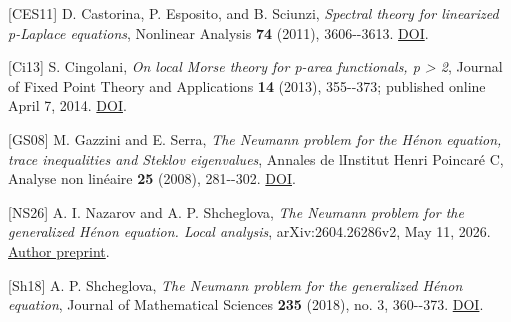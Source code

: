 \documentclass[11pt]{article}
\begin{document}
{[}CES11{]} D. Castorina, P. Esposito, and B. Sciunzi, \emph{Spectral
theory for linearized p-Laplace equations}, Nonlinear Analysis
\textbf{74} (2011), 3606-\/-3613.
\href{https://doi.org/10.1016/j.na.2011.03.009}{DOI}.

{[}Ci13{]} S. Cingolani, \emph{On local Morse theory for p-area
functionals, p \textgreater{} 2}, Journal of Fixed Point Theory and
Applications \textbf{14} (2013), 355-\/-373; published online April 7,
2014. \href{https://doi.org/10.1007/s11784-014-0163-6}{DOI}.

{[}GS08{]} M. Gazzini and E. Serra, \emph{The Neumann problem for the
Hénon equation, trace inequalities and Steklov eigenvalues}, Annales de
l\textquotesingle Institut Henri Poincaré C, Analyse non linéaire
\textbf{25} (2008), 281-\/-302.
\href{https://doi.org/10.1016/j.anihpc.2006.09.003}{DOI}.

{[}NS26{]} A. I. Nazarov and A. P. Shcheglova, \emph{The Neumann problem
for the generalized Hénon equation. Local analysis}, arXiv:2604.26286v2,
May 11, 2026. \href{https://arxiv.org/abs/2604.26286}{Author preprint}.

{[}Sh18{]} A. P. Shcheglova, \emph{The Neumann problem for the
generalized Hénon equation}, Journal of Mathematical Sciences
\textbf{235} (2018), no. 3, 360-\/-373.
\href{https://doi.org/10.1007/s10958-018-4078-4}{DOI}.
\end{document}
